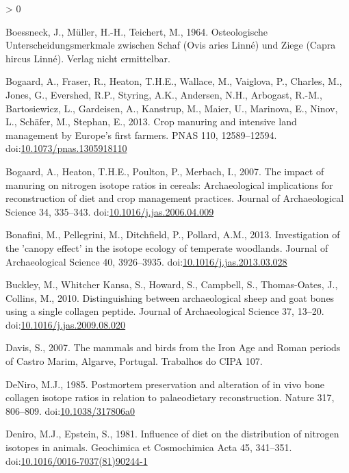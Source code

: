 \documentclass[5p]{elsarticle} %
\newlength{\cslhangindent}
\newenvironment{CSLReferences}[2] %
 {%
  \setlength{\parindent}{0pt}
  \ifodd #1 \everypar{\setlength{\hangindent}{\cslhangindent}}\ignorespaces\fi
  \ifnum #2 > 0
  \setlength{\parskip}{#2\baselineskip}
  \fi
 }%
 {}
\begin{document}
\begin{CSLReferences}{1}{0}
\leavevmode\hypertarget{ref-boessneck_etal64}{}%
Boessneck, J., Müller, H.-H., Teichert, M., 1964. Osteologische {Unterscheidungsmerkmale} zwischen {Schaf} ({Ovis} aries {Linné}) und {Ziege} ({Capra} hircus {Linné}). {Verlag nicht ermittelbar}.

\leavevmode\hypertarget{ref-bogaard_etal13}{}%
Bogaard, A., Fraser, R., Heaton, T.H.E., Wallace, M., Vaiglova, P., Charles, M., Jones, G., Evershed, R.P., Styring, A.K., Andersen, N.H., Arbogast, R.-M., Bartosiewicz, L., Gardeisen, A., Kanstrup, M., Maier, U., Marinova, E., Ninov, L., Schäfer, M., Stephan, E., 2013. Crop manuring and intensive land management by {Europe}'s first farmers. PNAS 110, 12589--12594. doi:\href{https://doi.org/10.1073/pnas.1305918110}{10.1073/pnas.1305918110}

\leavevmode\hypertarget{ref-bogaard_etal07}{}%
Bogaard, A., Heaton, T.H.E., Poulton, P., Merbach, I., 2007. The impact of manuring on nitrogen isotope ratios in cereals: Archaeological implications for reconstruction of diet and crop management practices. Journal of Archaeological Science 34, 335--343. doi:\href{https://doi.org/10.1016/j.jas.2006.04.009}{10.1016/j.jas.2006.04.009}

\leavevmode\hypertarget{ref-bonafini_etal13}{}%
Bonafini, M., Pellegrini, M., Ditchfield, P., Pollard, A.M., 2013. Investigation of the 'canopy effect' in the isotope ecology of temperate woodlands. Journal of Archaeological Science 40, 3926--3935. doi:\href{https://doi.org/10.1016/j.jas.2013.03.028}{10.1016/j.jas.2013.03.028}

\leavevmode\hypertarget{ref-buckley_etal10}{}%
Buckley, M., Whitcher Kansa, S., Howard, S., Campbell, S., Thomas-Oates, J., Collins, M., 2010. Distinguishing between archaeological sheep and goat bones using a single collagen peptide. Journal of Archaeological Science 37, 13--20. doi:\href{https://doi.org/10.1016/j.jas.2009.08.020}{10.1016/j.jas.2009.08.020}

\leavevmode\hypertarget{ref-davis07}{}%
Davis, S., 2007. The mammals and birds from the {Iron Age} and {Roman} periods of {Castro Marim}, {Algarve}, {Portugal}. Trabalhos do CIPA 107.

\leavevmode\hypertarget{ref-deniro85}{}%
DeNiro, M.J., 1985. Postmortem preservation and alteration of in vivo bone collagen isotope ratios in relation to palaeodietary reconstruction. Nature 317, 806--809. doi:\href{https://doi.org/10.1038/317806a0}{10.1038/317806a0}

\leavevmode\hypertarget{ref-deniro_epstein81}{}%
Deniro, M.J., Epstein, S., 1981. Influence of diet on the distribution of nitrogen isotopes in animals. Geochimica et Cosmochimica Acta 45, 341--351. doi:\href{https://doi.org/10.1016/0016-7037(81)90244-1}{10.1016/0016-7037(81)90244-1}


\end{CSLReferences}
\end{document}
